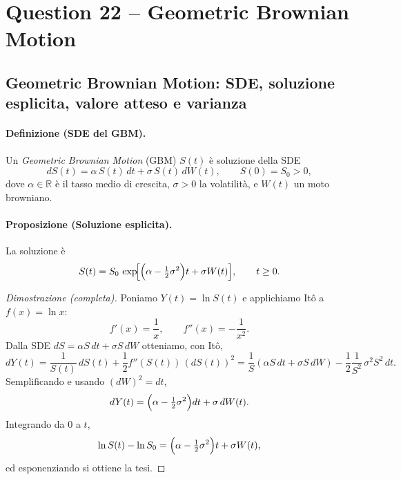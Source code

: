 \documentclass[12pt,a4paper]{book}
\theoremstyle{remark}
\begin{document}
\newpage
\section{Question 22 -- Geometric Brownian Motion}
\subsection*{Geometric Brownian Motion: SDE, soluzione esplicita, valore atteso e varianza}

\paragraph{Definizione (SDE del GBM).}
Un \emph{Geometric Brownian Motion} (GBM) $S(t)$ è soluzione della SDE
\[
dS(t)=\alpha\,S(t)\,dt+\sigma\,S(t)\,dW(t),\qquad S(0)=S_0>0,
\]
dove $\alpha\in\mathbb{R}$ è il tasso medio di crescita, $\sigma>0$ la volatilità, e $W(t)$ un moto browniano.

\paragraph{Proposizione (Soluzione esplicita).}
La soluzione è
\[
S(t)=S_0\,\exp\!\Bigl[\Bigl(\alpha-\tfrac{1}{2}\sigma^2\Bigr)t+\sigma W(t)\Bigr],\qquad t\ge 0.
\]

\begin{proof}[Dimostrazione (completa)]
Poniamo $Y(t)=\ln S(t)$ e applichiamo Itô a $f(x)=\ln x$:
\[
f'(x)=\frac{1}{x},\qquad f''(x)=-\frac{1}{x^2}.
\]
Dalla SDE $dS=\alpha S\,dt+\sigma S\,dW$ otteniamo, con Itô,
\[
dY(t)=\frac{1}{S(t)}\,dS(t)+\frac{1}{2}f''(S(t))\,(dS(t))^2
       =\frac{1}{S}(\alpha S\,dt+\sigma S\,dW)-\frac{1}{2}\frac{1}{S^2}\,\sigma^2 S^2\,dt.
\]
Semplificando e usando $(dW)^2=dt$,
\[
dY(t)=\Bigl(\alpha-\tfrac{1}{2}\sigma^2\Bigr)dt+\sigma\,dW(t).
\]
Integrando da $0$ a $t$,
\[
\ln S(t)-\ln S_0=\Bigl(\alpha-\tfrac{1}{2}\sigma^2\Bigr)t+\sigma W(t),
\]
ed esponenziando si ottiene la tesi.
\end{proof}
\end{document}
